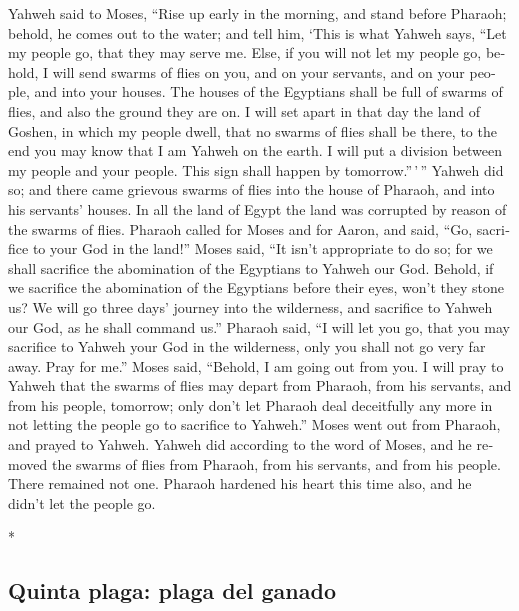 \begin{paracol}{2}
\begin{otherlanguage}{english}
 Yahweh said to Moses, ``Rise up early in the morning,
and stand before Pharaoh; behold, he comes out to the water; and tell
him, `This is what Yahweh says, ``Let my people go, that they may serve
me.  Else, if you will not let my people go, behold, I
will send swarms of flies on you, and on your servants, and on your
people, and into your houses. The houses of the Egyptians shall be full
of swarms of flies, and also the ground they are on.  I
will set apart in that day the land of Goshen, in which my people dwell,
that no swarms of flies shall be there, to the end you may know that I
am Yahweh on the earth.  I will put a division between my
people and your people. This sign shall happen by tomorrow.''\,'\,''
 Yahweh did so; and there came grievous swarms of flies
into the house of Pharaoh, and into his servants' houses. In all the
land of Egypt the land was corrupted by reason of the swarms of flies.
 Pharaoh called for Moses and for Aaron, and said, ``Go,
sacrifice to your God in the land!''  Moses said, ``It
isn't appropriate to do so; for we shall sacrifice the abomination of
the Egyptians to Yahweh our God. Behold, if we sacrifice the abomination
of the Egyptians before their eyes, won't they stone us? 
We will go three days' journey into the wilderness, and sacrifice to
Yahweh our God, as he shall command us.''  Pharaoh said,
``I will let you go, that you may sacrifice to Yahweh your God in the
wilderness, only you shall not go very far away. Pray for me.''
 Moses said, ``Behold, I am going out from you. I will
pray to Yahweh that the swarms of flies may depart from Pharaoh, from
his servants, and from his people, tomorrow; only don't let Pharaoh deal
deceitfully any more in not letting the people go to sacrifice to
Yahweh.''  Moses went out from Pharaoh, and prayed to
Yahweh.  Yahweh did according to the word of Moses, and
he removed the swarms of flies from Pharaoh, from his servants, and from
his people. There remained not one.  Pharaoh hardened his
heart this time also, and he didn't let the people go.

\end{otherlanguage}

\switchcolumn[0]*

\hypertarget{quinta-plaga-plaga-del-ganado}{%
\subsection{Quinta plaga: plaga del
ganado}\label{quinta-plaga-plaga-del-ganado}}


\end{paracol}
